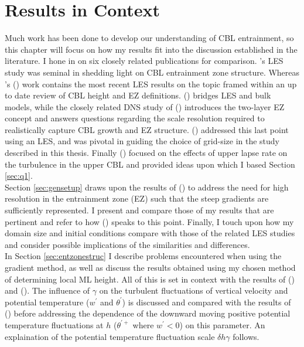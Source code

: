 
\chapter{Results in Context}
\label{ch:disc}
\setlength{\parindent}{0cm}

Much work has been done to develop our understanding of \acs{CBL} entrainment, so this chapter will focus on how my results fit into the discussion established in the literature.  I hone in on six closely related publications for comparison.  \citeauthor{SullMoengStev}'s \citeyear{SullMoengStev} \acs{LES} study was seminal in shedding light on \acs{CBL} entrainment zone structure.  Whereas \citeauthor{BrooksFowler2}'s (\citeyear{BrooksFowler2}) work contains the most recent \acs{LES} results on the topic framed within an up to date review of \acs{CBL} height and \acs{EZ} definitions.  \citeauthor{FedConzMir04} (\citeyear{FedConzMir04}) bridges \acs{LES} and bulk models, while the closely related \acs{DNS} study of \citeauthor{GarciaMellado} (\citeyear{GarciaMellado}) introduces the two-layer \acs{EZ} concept and answers questions regarding the scale resolution required to realistically capture \acs{CBL} growth and \acs{EZ} structure.  \citeauthor{SullPat} (\citeyear{SullPat}) addressed this last point using an \acs{LES}, and was pivotal in guiding the choice of grid-size in the study described in this thesis.  Finally \citeauthor{Sorbjan1} (\citeyear{Sorbjan1}) focused on the effects of upper lapse rate on the turbulence in the upper \acs{CBL} and provided ideas upon which I based Section \ref{sec:q1}.\\

Section \ref{sec:gensetup} draws upon the results of \citeauthor{SullPat} (\citeyear{SullPat}) to address the need for high resolution in the entrainment zone (\acs{EZ}) such that the steep gradients are sufficiently represented. I present and compare those of my results that are pertinent and refer to how \citeauthor{GarciaMellado} (\citeyear{GarciaMellado}) speaks to this point.  Finally, I touch upon how my domain size and initial conditions compare with those of the related \acs{LES} studies and consider possible implications of the similarities and differences.\\

In Section \ref{sec:entzonestruc} I describe problems encountered when using the gradient method, as well as discuss the results obtained using my chosen method of determining local \acs{ML} height.  All of this is set in context with the results of \citeauthor{SullMoengStev} (\citeyear{SullMoengStev}) and \citeauthor{BrooksFowler2} (\citeyear{BrooksFowler2}).  The influence of $\gamma$ on the turbulent fluctuations of vertical velocity and potential temperature ($w^{'}$ and $\theta^{'}$) is discussed and compared with the results of \citeauthor{Sorbjan1} (\citeyear{Sorbjan1}) before addressing the dependence of the downward moving positive potential temperature fluctuations at $h$ ($\theta^{'+}$ where $w^{'}<0$) on this parameter.  An explaination of the potential temperature fluctuation scale $\delta h \gamma$ follows.\\ 


